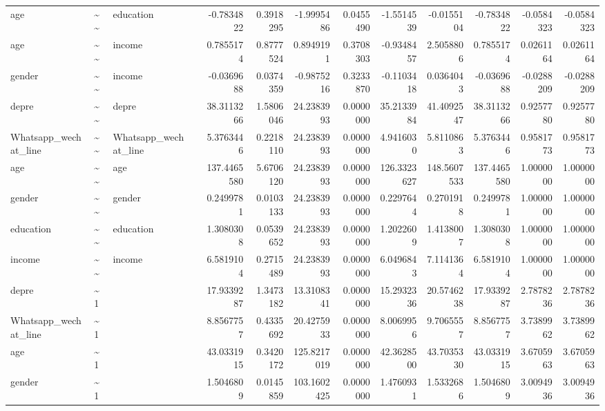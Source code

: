 \documentclass[
]{article}
\begin{document}
\begin{table}[!h]
\begin{tabular}[t]{llllrrrrrrrrr}
age & \textasciitilde{}\textasciitilde{} & education &  & -0.7834822 & 0.3918295 & -1.9995486 & 0.0455490 & -1.5514539 & -0.0155104 & -0.7834822 & -0.0584323 & -0.0584323\\
age & \textasciitilde{}\textasciitilde{} & income &  & 0.7855174 & 0.8777524 & 0.8949191 & 0.3708303 & -0.9348457 & 2.5058806 & 0.7855174 & 0.0261164 & 0.0261164\\
gender & \textasciitilde{}\textasciitilde{} & income &  & -0.0369688 & 0.0374359 & -0.9875216 & 0.3233870 & -0.1103418 & 0.0364043 & -0.0369688 & -0.0288209 & -0.0288209\\
\addlinespace
depre & \textasciitilde{}\textasciitilde{} & depre &  & 38.3113266 & 1.5806046 & 24.2383993 & 0.0000000 & 35.2133984 & 41.4092547 & 38.3113266 & 0.9257780 & 0.9257780\\
Whatsapp\_wechat\_line & \textasciitilde{}\textasciitilde{} & Whatsapp\_wechat\_line &  & 5.3763446 & 0.2218110 & 24.2383993 & 0.0000000 & 4.9416030 & 5.8110863 & 5.3763446 & 0.9581773 & 0.9581773\\
age & \textasciitilde{}\textasciitilde{} & age &  & 137.4465580 & 5.6706120 & 24.2383993 & 0.0000000 & 126.3323627 & 148.5607533 & 137.4465580 & 1.0000000 & 1.0000000\\
gender & \textasciitilde{}\textasciitilde{} & gender &  & 0.2499781 & 0.0103133 & 24.2383993 & 0.0000000 & 0.2297644 & 0.2701918 & 0.2499781 & 1.0000000 & 1.0000000\\
education & \textasciitilde{}\textasciitilde{} & education &  & 1.3080308 & 0.0539652 & 24.2383993 & 0.0000000 & 1.2022609 & 1.4138007 & 1.3080308 & 1.0000000 & 1.0000000\\
\addlinespace
income & \textasciitilde{}\textasciitilde{} & income &  & 6.5819104 & 0.2715489 & 24.2383993 & 0.0000000 & 6.0496843 & 7.1141364 & 6.5819104 & 1.0000000 & 1.0000000\\
depre & \textasciitilde{}1 &  &  & 17.9339287 & 1.3473182 & 13.3108341 & 0.0000000 & 15.2932336 & 20.5746238 & 17.9339287 & 2.7878236 & 2.7878236\\
Whatsapp\_wechat\_line & \textasciitilde{}1 &  &  & 8.8567757 & 0.4335692 & 20.4275933 & 0.0000000 & 8.0069956 & 9.7065557 & 8.8567757 & 3.7389962 & 3.7389962\\
age & \textasciitilde{}1 &  &  & 43.0331915 & 0.3420172 & 125.8217019 & 0.0000000 & 42.3628500 & 43.7035330 & 43.0331915 & 3.6705963 & 3.6705963\\
gender & \textasciitilde{}1 &  &  & 1.5046809 & 0.0145859 & 103.1602425 & 0.0000000 & 1.4760931 & 1.5332686 & 1.5046809 & 3.0094936 & 3.0094936\\

\end{tabular}
\end{table}
\end{document}
